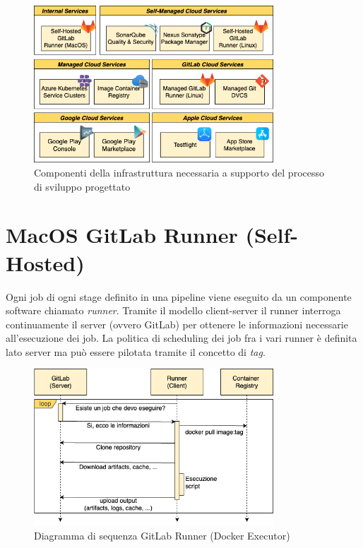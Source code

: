 \begin{figure}[H]
\centering
\includegraphics[width=0.8\textwidth]{img/tesi-3-infra.drawio.png}
\caption{Componenti della infrastruttura necessaria a supporto del processo di sviluppo progettato}
\end{figure}

\section{MacOS GitLab Runner (Self-Hosted)}
Ogni job di ogni stage definito in una pipeline viene eseguito da un componente software chiamato \textit{runner}. Tramite il modello client-server il runner interroga continuamente il server (ovvero GitLab) per ottenere le informazioni necessarie all'esecuzione dei job. La politica di scheduling dei job fra i vari runner è definita lato server ma può essere pilotata tramite il concetto di \textit{tag}.

\begin{figure}[H]
\centering
\includegraphics[width=0.8\textwidth]{img/tesi-17-runner.drawio.png}
\caption{Diagramma di sequenza GitLab Runner (Docker Executor)}
\label{fig:archrunner}
\end{figure}

